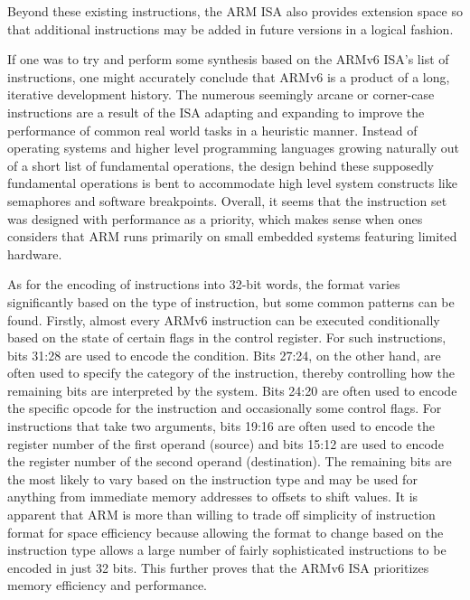 \documentclass[onecolumn, draftclsnofoot, 10pt, compsoc]{IEEEtran}
\begin{document}
Beyond these existing instructions, the ARM ISA also provides extension space so that additional instructions may be added in future versions in a logical fashion. 

If one was to try and perform some synthesis based on the ARMv6 ISA's list of instructions, one might accurately conclude that ARMv6 is a product of a long, iterative development history. The numerous seemingly arcane or corner-case instructions are a result of the ISA adapting and expanding to improve the performance of common real world tasks in a heuristic manner. Instead of operating systems and higher level programming languages growing naturally out of a short list of fundamental operations, the design behind these supposedly fundamental operations is bent to accommodate high level system constructs like semaphores and software breakpoints. Overall, it seems that the instruction set was designed with performance as a priority, which makes sense when ones considers that ARM runs primarily on small embedded systems featuring limited hardware.

As for the encoding of instructions into 32-bit words, the format varies significantly based on the type of instruction, but some common patterns can be found. Firstly, almost every ARMv6 instruction can be executed conditionally based on the state of certain flags in the control register. For such instructions, bits 31:28 are used to encode the condition. Bits 27:24, on the other hand, are often used to specify the category of the instruction, thereby controlling how the remaining bits are interpreted by the system. Bits 24:20 are often used to encode the specific opcode for the instruction and occasionally some control flags. For instructions that take two arguments, bits 19:16 are often used to encode the register number of the first operand (source) and bits 15:12 are used to encode the register number of the second operand (destination). The remaining bits are the most likely to vary based on the instruction type and may be used for anything from immediate memory addresses to offsets to shift values. It is apparent that ARM is more than willing to trade off simplicity of instruction format for space efficiency because allowing the format to change based on the instruction type allows a large number of fairly sophisticated instructions to be encoded in just 32 bits. This further proves that the ARMv6 ISA prioritizes memory efficiency and performance.
\end{document}
